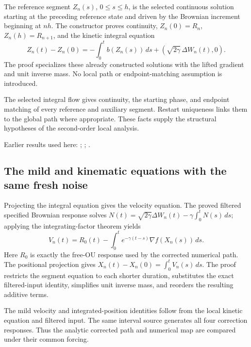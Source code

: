\documentclass[11pt,a4paper]{report}
\begin{document}
The reference segment \(Z_n(s)\), \(0\le s\le h\), is the selected continuous solution starting at the preceding reference state and driven by the Brownian increment beginning at \(nh\). The constructor proves continuity, \(Z_n(0)=R_n\), \(Z_n(h)=R_{n+1}\), and the kinetic integral equation \[Z_n(t)-Z_n(0)=-\int_0^tb(Z_n(s))\,ds+(\sqrt{2\gamma}\,\Delta W_n(t),0).\] The proof specializes these already constructed solutions with the lifted gradient and unit inverse mass. No local path or endpoint-matching assumption is introduced.



The selected integral flow gives continuity, the starting phase, and endpoint matching of every reference and auxiliary segment. Restart uniqueness links them to the global path where appropriate. These facts supply the structural hypotheses of the second-order local analysis.



Earlier results used here: \cite[Section~3.13.2]{LangevinLean2026ULASC}; \cite[Section~3.13.5]{LangevinLean2026ULASC}; \cite[Section~3.17.1]{LangevinLean2026ULASC}.
\subsection{\texorpdfstring{The mild and kinematic equations with the same fresh noise}{The mild and kinematic equations with the same fresh noise}}
\label{report-step-KineticLangevin-CanonicalSecondOrderSegments-lean-2}


Projecting the integral equation gives the velocity equation. The proved filtered specified Brownian response solves \(N(t)=\sqrt{2\gamma}\Delta W_n(t)-\gamma\int_0^tN(s)\,ds\); applying the integrating-factor theorem yields \[V_n(t)=R_0(t)-\int_0^te^{-\gamma(t-s)}\nabla f(X_n(s))\,ds.\] Here \(R_0\) is exactly the free-OU response used by the corrected numerical path. The positional projection gives \(X_n(t)-X_n(0)=\int_0^tV_n(s)\,ds\). The proof restricts the segment equation to each shorter duration, substitutes the exact filtered-input identity, simplifies unit inverse mass, and reorders the resulting additive terms.



The mild velocity and integrated-position identities follow from the local kinetic equation and filtered input. The same interval source generates all four correction responses. Thus the analytic corrected path and numerical map are compared under their common forcing.
\end{document}
